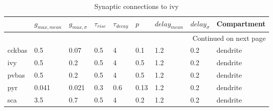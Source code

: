 \begin{longtable}{lllllllll}
\caption{Synaptic connections to ivy}\label{ivy_synapses}\\
\toprule
{} &   $g_{max, mean}$ & $g_{max, \sigma}$ & $\tau_{rise}$ & $\tau_{decay}$ &  $p$ & $delay_{mean}$ & $delay_{\sigma}$ & Compartment \\
\midrule
\endhead
\midrule
\multicolumn{9}{r}{{Continued on next page}} \\
\midrule
\endfoot

\bottomrule
\endlastfoot
cckbas &    0.5 &     0.07 &      0.5 &         4 &   0.1 &   1.2 &       0.2 &      dendrite\ \\
ivy    &    0.5 &      0.2 &      0.5 &         4 &   0.5 &   1.2 &       0.2 &      dendrite\ \\
pvbas  &    0.5 &      0.2 &      0.5 &         4 &   0.5 &   1.2 &       0.2 &      dendrite\ \\
pyr    &  0.041 &    0.021 &      0.3 &       0.6 &  0.13 &   1.2 &       0.2 &      dendrite\ \\
sca    &    3.5 &      0.7 &      0.5 &         4 &   0.2 &   1.2 &       0.2 &      dendrite\ \\
\end{longtable}
